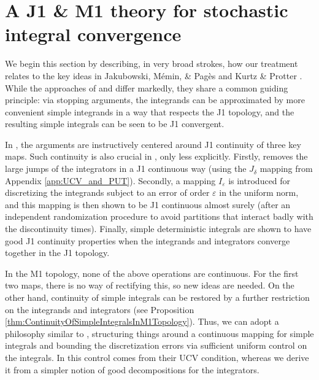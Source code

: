 \documentclass[11pt]{article}
\theoremstyle{definition}\newtheorem{example}[theorem]{Example}
\theoremstyle{definition}\newtheorem{counterexample}[theorem]{Counterexample}
\theoremstyle{definition}\newtheorem{remark}[theorem]{Remark}
\theoremstyle{definition}\newtheorem{defi}[theorem]{Definition}
\numberwithin{equation}{section}
\renewcommand{\|}{\; : \, \;}											%
\begin{document}
\section{A J1 \& M1 theory for stochastic integral convergence}
\label{sect:stoch_int_conv}

We begin this section by describing, in very broad strokes, how our treatment relates to the key ideas in Jakubowski, Mémin, \& Pag\`es \cite{jakubowskimeminpages} and Kurtz \& Protter \cite{kurtzprotter}. While the approaches of \cite{jakubowskimeminpages} and \cite{kurtzprotter} differ markedly, they share a common guiding principle: via stopping arguments, the integrands can be approximated by more convenient simple integrands in a way that respects the J1 topology, and the resulting simple integrals can be seen to be J1 convergent.

In \cite{kurtzprotter}, the arguments are instructively centered around J1 continuity of three key maps. Such continuity is also crucial in \cite{jakubowskimeminpages}, only less explicitly.
Firstly, \cite{kurtzprotter} removes the large jumps of the integrators in a J1 continuous way (using the $J_\delta$ mapping from Appendix \ref{app:UCV_and_PUT}). Secondly, a mapping $I_\varepsilon$ is introduced for discretizing the integrands subject to an error of order $\varepsilon$ in the uniform norm, and this mapping is then shown to be J1 continuous almost surely (after an independent randomization procedure to avoid partitions that interact badly with the discontinuity times). Finally, simple deterministic integrals are shown to have good J1 continuity properties when the integrands and integrators converge together in the J1 topology.


In the M1 topology, none of the above operations are continuous. For the first two maps, there is no way of rectifying this, so new ideas are needed. On the other hand, continuity of simple integrals can be restored by a further restriction on the integrands and integrators (see Proposition \ref{thm:ContinuityOfSimpleIntegralsInM1Topology}). Thus, we can adopt a philosophy similar to \cite{kurtzprotter}, structuring things around a continuous mapping for simple integrals and bounding the discretization errors via sufficient uniform control on the integrals. In \cite{kurtzprotter} this control comes from their UCV condition, whereas we derive it from a simpler notion of good decompositions for the integrators. 
\end{document}
